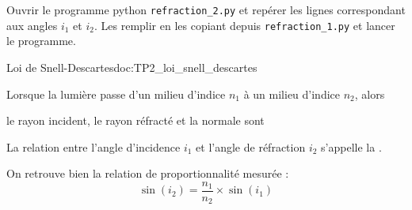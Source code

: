 
\mesure
Ouvrir le programme python \texttt{refraction\_2.py} et repérer les lignes correspondant aux angles $i_1$ et $i_2$.
Les remplir en les copiant depuis \texttt{refraction\_1.py} et lancer le programme.



\begin{doc}{Loi de Snell-Descartes}{doc:TP2_loi_snell_descartes}
  \begin{encart}
    Lorsque la lumière passe d'un milieu d'indice $n_1$ à un milieu d'indice $n_2$, alors
    \begin{listePoints}
      \item le rayon incident, le rayon réfracté et la normale sont 
      \item \;
      \item \;
    \end{listePoints}
    
    La relation entre l'angle d'incidence $i_1$ et l'angle de réfraction $i_2$ s'appelle la .
  \end{encart}
  
  On retrouve bien la relation de proportionnalité mesurée :
  \begin{equation*}
    \sin(i_2) = \dfrac{n_1}{n_2} \times \sin(i_1)
  \end{equation*}
\end{doc}

